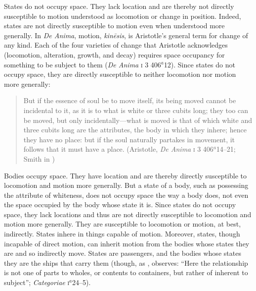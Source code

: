 States do not occupy space. They lack location and are there\-by not directly susceptible to motion understood as locomotion or change in position. Indeed, states are not directly susceptible to motion even when understood more generally. In \emph{De Anima}, motion, \emph{kinēsis}, is Aristotle's general term for change of any kind. Each of the four varieties of change that Aristotle acknowledges (locomotion, alteration, growth, and decay) requires space occupancy for something to be subject to them (\emph{De Anima} \textsc{i} 3 406\( ^{a} \)12). Since states do not occupy space, they are directly susceptible to neither locomotion nor motion more generally:
\begin{quote}
	But if the essence of soul be to move itself, its being moved cannot be incidental to it, as it is to what is white or three cubits long; they too can be moved, but only incidentally---what is moved is that of which white and three cubits long are the attributes, the body in which they inhere; hence they have no place: but if the soul naturally partakes in movement, it follows that it must have a place. (Aristotle, \emph{De Anima} \textsc{i} 3 406\( ^{a} \)14--21; Smith in \citealt[9]{Barnes:1984uq})
\end{quote}
Bodies occupy space. They have location and are there\-by directly susceptible to locomotion and motion more generally. But a state of a body, such as possessing the attribute of whiteness, does not occupy space the way a body does, not even the space occupied by the body whose state it is. Since states do not occupy space, they lack locations and thus are not directly susceptible to locomotion and motion more generally. They are susceptible to locomotion or motion, at best, indirectly. States inhere in things capable of motion. Moreover, states, though incapable of direct motion, can inherit motion from the bodies whose states they are and so indirectly move.  States are passengers, and the bodies whose states they are the ships that carry them (though, as \citealt[174]{Witt:1995kx}, observes: ``Here the relationship is not one of parts to wholes, or contents to containers, but rather of inherent to subject''; \emph{Categoriae} \textsc{i}\( ^{a} \)24--5).

